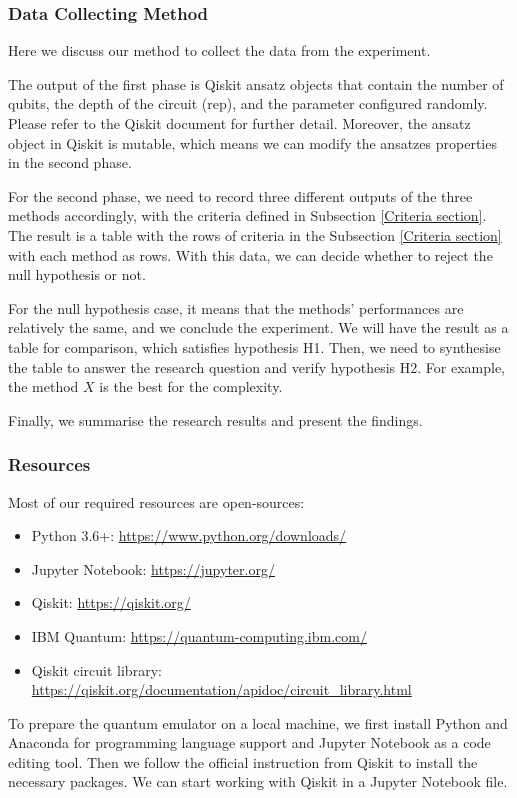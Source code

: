 \subsubsection{Data Collecting Method}
\label{Data Collecting Section}
Here we discuss our method to collect the data from the experiment.

The output of the first phase is Qiskit ansatz objects that contain the number of qubits, the depth of the circuit (rep), and the parameter configured randomly. Please refer to the Qiskit document for further detail.
Moreover, the ansatz object in Qiskit is mutable, which means we can modify the ansatzes properties in the second phase.

For the second phase, we need to record three different outputs of the three methods accordingly, with the criteria defined in Subsection \ref{Criteria section}.
The result is a table with the rows of criteria in the Subsection \ref{Criteria section} with each method as rows.
With this data, we can decide whether to reject the null hypothesis or not.

For the null hypothesis case, it means that the methods' performances are relatively the same, and we conclude the experiment.
We will have the result as a table for comparison, which satisfies hypothesis H1.
Then, we need to synthesise the table to answer the research question and verify hypothesis H2.
For example, the method $X$ is the best for the complexity.

Finally, we summarise the research results and present the findings.

\subsubsection{Resources}
Most of our required resources are open-sources:
\begin{itemize}
    \item Python 3.6+: \url{https://www.python.org/downloads/}
    \item Jupyter Notebook: \url{https://jupyter.org/}
    \item Qiskit: \url{https://qiskit.org/}
    \item IBM Quantum: \url{https://quantum-computing.ibm.com/}
    \item Qiskit circuit library: \url{https://qiskit.org/documentation/apidoc/circuit_library.html}
\end{itemize}

To prepare the quantum emulator on a local machine, we first install Python and Anaconda for programming language support and Jupyter Notebook as a code editing tool.
Then we follow the official instruction from Qiskit \cite{Qiskit} to install the necessary packages.
We can start working with Qiskit in a Jupyter Notebook file.

